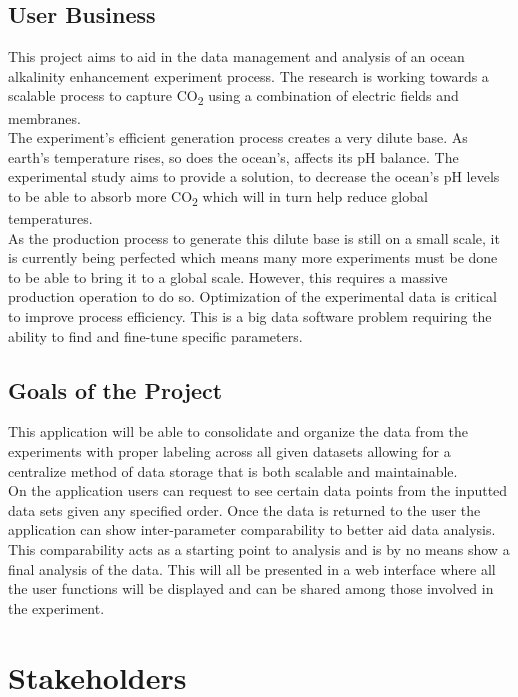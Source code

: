\documentclass[12pt]{article}
\begin{document}
\subsection{User Business}
This project aims to aid in the data management and analysis of an ocean
alkalinity enhancement experiment process. The research is working towards a
scalable process to capture CO\textsubscript{2} using a combination of electric
fields and membranes.\\
\newline
The experiment's efficient generation process creates a very dilute base. As earth’s temperature rises,
so does the ocean’s, affects its pH balance. The experimental study aims to provide a solution, to decrease the
ocean's pH levels to be able to absorb more CO\textsubscript{2} which will in
turn help reduce global temperatures.\\
\newline
As the production process to generate this dilute base is still on a small scale, it is currently being perfected
which means many more experiments must be done to be able to bring it to a
global scale. However, this requires a massive production operation to do so.
Optimization of the experimental data is critical to improve process efficiency.
This is a big data software problem requiring the ability to find and fine-tune
specific parameters. 
\subsection{Goals of the Project}
This application will be able to consolidate and organize the data from the
experiments with proper labeling across all given datasets allowing for a
centralize method of data storage that is both scalable and maintainable.\\
\newline
On the application users can request to see certain data points from the inputted data
sets given any specified order. Once the data is returned to the user the
application can show inter-parameter comparability to better aid data analysis.\\
\newline
This comparability acts as a starting point to analysis and is by no means show
a final analysis of the data. This will all be presented in a web interface
where all the user functions will be displayed and can be shared among those
involved in the experiment.   
\section{Stakeholders}
\end{document}
